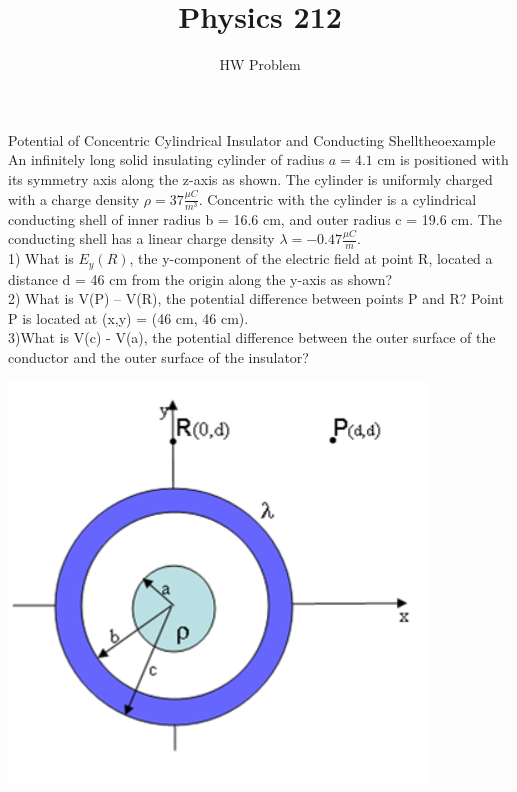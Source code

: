 \documentclass{article}
\title{Physics 212}
\date{\vspace{-5ex}}
\author{HW Problem}
\begin{document}
\maketitle

\begin{mytheo}{Potential of Concentric Cylindrical Insulator and Conducting Shell}{theoexample}
	An infinitely long solid insulating cylinder of radius $a = 4.1$ cm is positioned with its symmetry axis along the z-axis as shown. The cylinder is uniformly charged with a charge density $\rho = 37\frac{\mu C}{m^3}$. Concentric with the cylinder is a cylindrical conducting shell of inner radius b = 16.6 cm, and outer radius c = 19.6 cm. The conducting shell has a linear charge density $\lambda = -0.47 \frac{\mu C}{m}.$\\

1)
What is $ E_{y}(R)$, the y-component of the electric field at point R, located a distance d = 46 cm from the origin along the y-axis as shown? \\


2) What is V(P) – V(R), the potential difference between points P and R? Point P is located at (x,y) = (46 cm, 46 cm).\\

3)What is V(c) - V(a), the potential difference between the outer surface of the conductor and the outer surface of the insulator?\\
\end{mytheo}
\includegraphics{circle}
\end{document}
